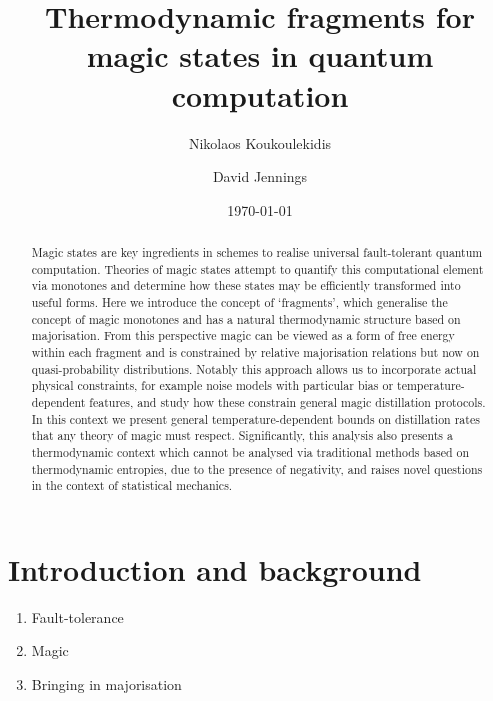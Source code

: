 \documentclass[pra,
aps,
twocolumn,
superscriptaddress,
groupedaddress,
nofootinbib,
reprint
]{revtex4-1}
\begin{document}
\begin{abstract}
\ddd{[To be sharpened]} Magic states are key ingredients in schemes to realise universal fault-tolerant quantum computation.
Theories of magic states attempt to quantify this computational element via monotones and determine how these states may be efficiently transformed into useful forms. Here we introduce the concept of `fragments', which generalise the concept of magic monotones and has a natural thermodynamic structure based on majorisation. From this perspective magic can be viewed as a form of free energy within each fragment and is constrained by relative majorisation relations but now on quasi-probability distributions. Notably this approach allows us to incorporate actual physical constraints, for example noise models with particular bias or temperature-dependent features, and study how these constrain general magic distillation protocols. In this context we present general temperature-dependent bounds on distillation rates that any theory of magic must respect. Significantly, this analysis also presents a thermodynamic context which cannot be analysed via traditional methods based on thermodynamic entropies, due to the presence of negativity, and raises novel questions in the context of statistical mechanics.
\end{abstract}


\title{Thermodynamic fragments for magic states in quantum computation}

\author{Nikolaos Koukoulekidis}
\author{David Jennings}

\date{\today}
\maketitle


\section{Introduction and background}
\label{sec:intro_prev}

\begin{enumerate}
    \item Fault-tolerance~\cite{cit:raussendorf, cit:gross2, cit:markov, cit:gross, cit:nest, cit:nest2, cit:vidal, cit:fujii, cit:gottesman}
    \item Magic~\cite{cit:veitch, cit:veitch2, cit:wang, cit:wang2, cit:howard, cit:campbell, cit:gross3, cit:gross4}
    \item Bringing in majorisation~\cite{cit:cwiklinski, cit:lostaglio2, cit:lostaglio, cit:gour, cit:janzing, cit:brandao2, cit:gour2, cit:marshall, cit:nielsen}
\end{enumerate}
\end{document}
